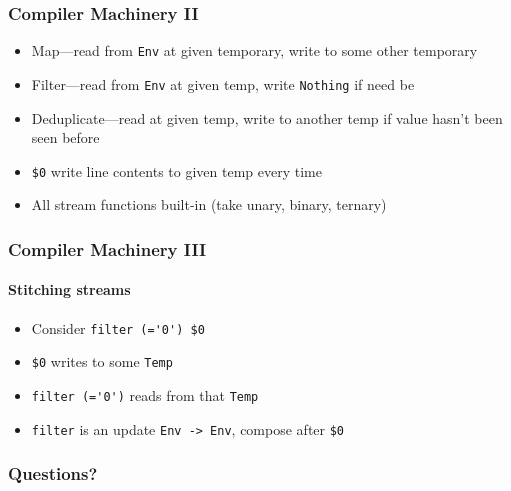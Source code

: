 \documentclass{beamer}
\begin{document}
\begin{frame}[fragile]
  \frametitle{Compiler Machinery II}
  \begin{itemize}
    \item Map---read from \verb|Env| at given temporary, write to some other temporary
    \item Filter---read from \verb|Env| at given temp, write \verb|Nothing| if need be
    \item Deduplicate---read at given temp, write to another temp if value hasn't been seen before
    \item \verb|$0| write line contents to given temp every time
    \item All stream functions built-in (take unary, binary, ternary)
  \end{itemize}
\end{frame}

\begin{frame}[fragile]
  \frametitle{Compiler Machinery III}
  \framesubtitle{Stitching streams}
  \begin{itemize}
    \item Consider \verb|filter (='0') $0|
    \item \verb|$0| writes to some \verb|Temp|
    \item \verb|filter (='0')| reads from that \verb|Temp|
    \item \verb|filter| is an update \verb|Env -> Env|, compose after \verb|$0|
  \end{itemize}
\end{frame}

\begin{frame}
  \frametitle{Questions?}
\end{frame}
\end{document}
